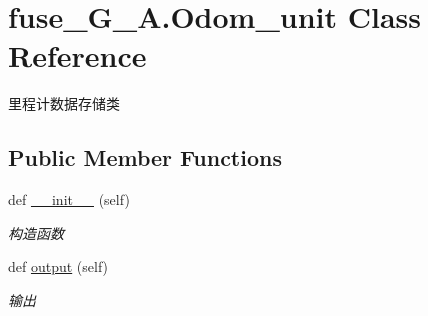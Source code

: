 \hypertarget{classfuse___g___a_1_1_odom__unit}{}\section{fuse\+\_\+\+G\+\_\+\+A.\+Odom\+\_\+unit Class Reference}
\label{classfuse___g___a_1_1_odom__unit}


里程计数据存储类  


\subsection*{Public Member Functions}
\begin{DoxyCompactItemize}
\item 
def \hyperlink{classfuse___g___a_1_1_odom__unit_a420542a0674acb8055e7221bbd73414e}{\+\_\+\+\_\+init\+\_\+\+\_\+} (self)
\begin{DoxyCompactList}\small\item\em 构造函数 \end{DoxyCompactList}\item 
def \hyperlink{classfuse___g___a_1_1_odom__unit_ab9da321766e96144c126c0cfedb4e957}{output} (self)
\begin{DoxyCompactList}\small\item\em 输出 \end{DoxyCompactList}\end{DoxyCompactItemize}
